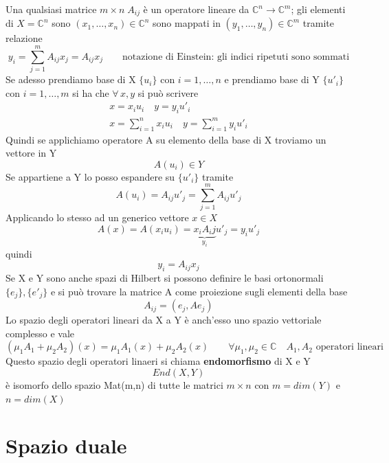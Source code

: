 \documentclass[a4paper,11pt]{report}
\theoremstyle{remark}
\theoremstyle{definition}
\newcommand{\C}{\mathbb{C}}
\begin{document}
Una qualsiasi matrice $m\times n \; A_{ij}$ è un operatore lineare da $\C^n \to \C^m$; gli elementi di $X=\C^n$ sono $(x_1,\dots,x_n)\in \C^n$ sono mappati in $(y_1,\dots,y_n)\in\C^m$ tramite relazione
\begin{equation*}
	y_i = \sum_{j=1}^m A_{ij}x_j = A_{ij}x_j \qquad \text{notazione di Einstein: gli indici ripetuti sono sommati}
\end{equation*}
Se adesso prendiamo base di X $\{u_i\}$ con $i=1,\dots,n$ e prendiamo base di Y $\{u'_i\}$ con $i=1,\dots,m$ si ha che $\forall \, x,y$ si può scrivere
\begin{gather*}
	x =x_iu_i \quad y=y_iu'_i \\
	x = \sum_{i=1}^n x_iu_i \quad y = \sum_{i=1}^m y_iu'_i
\end{gather*}
Quindi se applichiamo operatore A su elemento della base di X troviamo un vettore in Y 
\begin{equation*}
	A(u_i) \in Y
\end{equation*}
Se appartiene a Y lo posso espandere su $\{u'_i\}$ tramite 
\begin{equation*}
	A(u_i) = A_{ij}u'_j = \sum_{j=1}^m A_{ij}u'_j
\end{equation*}
Applicando lo stesso ad un generico vettore $x\in X$
\begin{equation*}
	A(x) = A(x_iu_i) = \underbrace{x_iA_ij}_{y_i}u'_j = y_iu'_j
\end{equation*}
quindi
\begin{equation*}
	y_i = A_{ij}x_j
\end{equation*}
Se X e Y sono anche spazi di Hilbert si possono definire le basi ortonormali $\{e_j\},\{e'_j\}$ e si può trovare la matrice A come proiezione sugli elementi della base 
\begin{equation*}
	A_{ij} = (e_j,Ae_j)
\end{equation*}
Lo spazio degli operatori lineari da X a Y è anch'esso uno spazio vettoriale complesso e vale
\begin{equation*}
	(\mu_1A_1+\mu_2A_2)(x)=\mu_1 A_1(x)+\mu_2 A_2(x) \qquad \forall\mu_1,\mu_2 \in \C \quad A_1,A_2 \text{ operatori lineari}
\end{equation*}
Questo spazio degli operatori linaeri si chiama \textbf{endomorfismo} di X e Y
\begin{equation*}
	End(X,Y)
\end{equation*}
è isomorfo dello spazio Mat(m,n) di tutte le matrici $m\times n$ con $m = dim(Y)$ e $n = dim(X)$

\section{Spazio duale}
\end{document}
